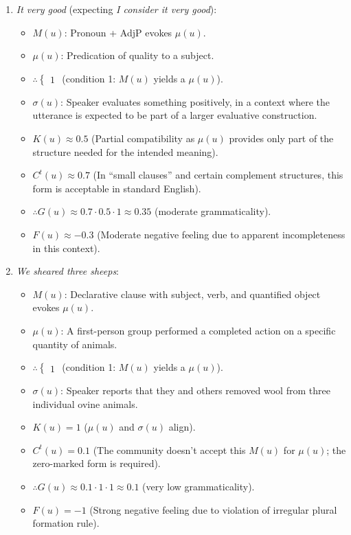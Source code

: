 \begin{enumerate}
    \item \textit{It very good} (expecting \textit{I consider it very good}):
    \begin{itemize}
    \item \(M(u)\): Pronoun + AdjP evokes \(\mu(u)\).
    \item \(\mu(u)\): Predication of quality to a subject.
    \item \(\therefore \begin{cases} 1 \end{cases}\) (condition 1: \(M(u)\) yields a \(\mu(u)\)).
    \item \(\sigma(u)\): Speaker evaluates something positively, in a context where the utterance is expected to be part of a larger evaluative construction.
    \item \(K(u) \approx 0.5\) (Partial compatibility as \(\mu(u)\) provides only part of the structure needed for the intended meaning).
    \item \(C^t(u) \approx 0.7\) (In \enquote{small clauses} and certain complement structures, this form is acceptable in standard English).
    \item \(\therefore G(u) \approx 0.7 \cdot 0.5 \cdot 1 \approx 0.35\) (moderate grammaticality).
    \item \(F(u) \approx -0.3\) (Moderate negative feeling due to apparent incompleteness in this context).
    \end{itemize}

    \item \textit{We sheared three sheeps}:
    \begin{itemize}
        \item \(M(u)\): Declarative clause with subject, verb, and quantified object evokes \(\mu(u)\).
        \item \(\mu(u)\): A first-person group performed a completed action on a specific quantity of animals.
        \item \(\therefore \begin{cases} 1 \end{cases}\) (condition 1: \(M(u)\) yields a \(\mu(u)\)).
        \item \(\sigma(u)\): Speaker reports that they and others removed wool from three individual ovine animals.
        \item \(K(u) = 1\) (\(\mu(u)\) and \(\sigma(u)\) align).
        \item \(C^t(u) = 0.1\) (The community doesn't accept this \(M(u)\) for \(\mu(u)\); the zero-marked form is required).
        \item \(\therefore G(u) \approx 0.1 \cdot 1 \cdot 1 \approx 0.1\) (very low grammaticality).
        \item \(F(u) = -1\) (Strong negative feeling due to violation of irregular plural formation rule).
    \end{itemize}


\end{enumerate}
